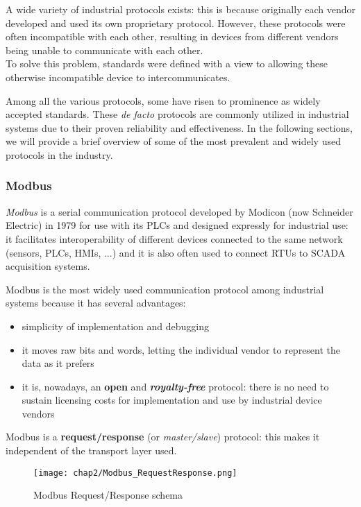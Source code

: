 \bigskip
A wide variety of industrial protocols exists: this is because originally each vendor developed and used its own proprietary protocol. However, these protocols were often incompatible with each other, resulting in devices from different vendors being unable to communicate with each other.
\\To solve this problem, standards were defined with a view to allowing these otherwise incompatible device to intercommunicates.

\bigskip
Among all the various protocols, some have risen to prominence as widely accepted standards. These \textit{de facto} protocols are commonly utilized in industrial systems due to their proven reliability and effectiveness. In the following sections, we will provide a brief overview of some of the most prevalent and widely used protocols in the industry.

\subsubsection{Modbus}
\label{subsec:modbus}
\textit{Modbus} is a serial communication protocol developed by Modicon (now Schneider Electric) in 1979 for use with its PLCs \cite{Modbus_definition} and designed expressly for industrial use: it facilitates interoperability of different devices connected to the same network (sensors, PLCs, HMIs, ...) and it is also often used to connect RTUs to SCADA acquisition systems.

\bigskip
Modbus is the most widely used communication protocol among industrial systems because it has several advantages:

\begin{itemize}
	\item simplicity of implementation and debugging
	\item it moves raw bits and words, letting the individual vendor to represent the data as it prefers
	\item it is, nowadays, an \textbf{open} and \textbf{\textit{royalty-free}} protocol: there is no need to sustain licensing costs for implementation and use by industrial device vendors
\end{itemize}

Modbus is a \textbf{request/response} (or \textit{master/slave}) protocol: this makes it independent of the transport layer used.

\begin{figure}[ht]
	\centering
	\texttt{[image: chap2/Modbus\_RequestResponse.png]}
	\caption{Modbus Request/Response schema}
	\label{fig:modbus_requestresponse}
\end{figure}

